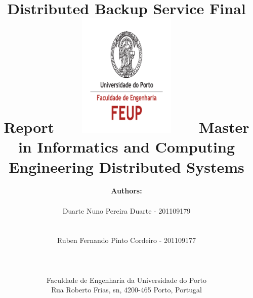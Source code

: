\documentclass[a4paper]{article}
\begin{document}
\setlength{\textwidth}{16cm}
\setlength{\textheight}{22cm}

\title{\Huge\textbf {Distributed Backup Service} \linebreak\linebreak\linebreak
\Large\textbf {Final Report} \linebreak\linebreak
\includegraphics [height=6cm, width=7cm] {feup.pdf} \linebreak \linebreak
\Large {Master in Informatics and Computing Engineering} \linebreak \linebreak
\Large {Distributed Systems} \linebreak
}

\author{\textbf {Authors:}\\ \centerline {Duarte Nuno Pereira Duarte - 201109179} \\ \centerline  {Ruben Fernando Pinto Cordeiro - 201109177} \\\linebreak\linebreak \\
 \\ Faculdade de Engenharia da Universidade do Porto 
 \\ Rua Roberto Frias, s\/n, 4200-465 Porto, Portugal \linebreak\linebreak\linebreak
\linebreak\linebreak\vspace{1cm}}
\maketitle
\thispagestyle {empty}
\end{document}

